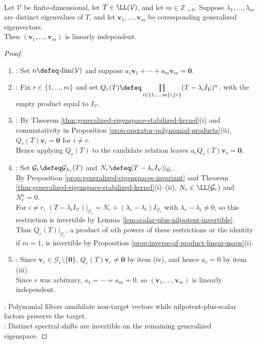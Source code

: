 \begin{theorem} \label{thm:distinct-generalized-eigenvectors-independent} \\
Let $\mathcal{V}$ be finite-dimensional, let $T\in\LL(\mathcal{V})$, and let $m\in\mathbb{Z}_{>0}$. Suppose $\lambda_1,\ldots,\lambda_m$ are distinct eigenvalues of $T$, and let $\mathbf{v}_1,\ldots,\mathbf{v}_m$ be corresponding generalized eigenvectors.\\
Then $(\mathbf{v}_1,\ldots,\mathbf{v}_m)$ is linearly independent.
\begin{proof}
\begin{enumerate}[label=(\roman*)]
\setlength{\itemsep}{0pt}
\item {}: Set $n\defeq\dim(\mathcal{V})$ and suppose $a_1\mathbf{v}_1+\cdots+a_m\mathbf{v}_m=\mathbf{0}$.
\item {}: Fix $r\in\{1,\ldots,m\}$ and set $Q_r(T)\defeq\prod\limits_{i\in\{1,\ldots,m\}\setminus\{r\}}(T-\lambda_iI_{\mathcal{V}})^n$, with the empty product equal to $I_{\mathcal{V}}$.
\item {}: By Theorem \ref{thm:generalized-eigenspace-stabilized-kernel}(i) and commutativity in Proposition \ref{prop:operator-polynomial-products}(ii), $Q_r(T)\mathbf{v}_i=\mathbf{0}$ for $i\neq r$.\\
Hence applying $Q_r(T)$ to the candidate relation leaves $a_rQ_r(T)\mathbf{v}_r=\mathbf{0}$.
\item {}: Set $\mathcal{G}_r\defeq\mathcal{G}_{\lambda_r}(T)$ and $N_r\defeq(T-\lambda_rI_{\mathcal{V}})|_{\mathcal{G}_r}$.\\
By Proposition \ref{prop:generalized-eigenspaces-invariant} and Theorem \ref{thm:generalized-eigenspace-stabilized-kernel}(i)--(ii), $N_r\in\LL(\mathcal{G}_r)$ and $N_r^n=0$.\\
For $i\neq r$, $(T-\lambda_iI_{\mathcal{V}})|_{\mathcal{G}_r}=N_r+(\lambda_r-\lambda_i)I_{\mathcal{G}_r}$ with $\lambda_r-\lambda_i\neq0$, so this restriction is invertible by Lemma \ref{lem:scalar-plus-nilpotent-invertible}.\\
Thus $Q_r(T)|_{\mathcal{G}_r}$, a product of $n$th powers of these restrictions or the identity if $m=1$, is invertible by Proposition \ref{prop:inverse-of-product-linear-maps}(i).
\item {}: Since $\mathbf{v}_r\in\mathcal{G}_r\setminus\{\mathbf{0}\}$, $Q_r(T)\mathbf{v}_r\neq\mathbf{0}$ by item (iv), and hence $a_r=0$ by item (iii).\\
Since $r$ was arbitrary, $a_1=\cdots=a_m=0$, so $(\mathbf{v}_1,\ldots,\mathbf{v}_m)$ is linearly independent.
\end{enumerate}
: Polynomial filters annihilate non-target vectors while nilpotent-plus-scalar factors preserve the target.\\
: Distinct spectral shifts are invertible on the remaining generalized eigenspace.
\end{proof}
\end{theorem}

